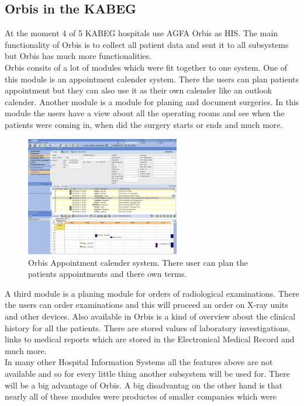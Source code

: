 \documentclass[a4paper]{article}
\begin{document}
	\subsection{Orbis in the KABEG}
	At the moment 4 of 5 KABEG hospitals use AGFA Orbis as HIS. The main
	functionality of Orbis is to collect all patient data and sent it to all
	subsystems but Orbis has much more functionalities.\\
	Orbis consits of a lot of modules which were fit together to one system. One of
	this module is an appointment calender system. There the users can plan
	patients appointment but they can also use it as their own calender like an
	outlook calender. Another module is a module for planing and document
	surgeries. In this module the users have a view about all the operating rooms
	and see when the patients were coming in, when did the surgery starts or ends
	and much more.\\
	\begin{figure}[!ht]
		  \centering
		      \includegraphics[width=0.6\textwidth]{orbis1}
		  \caption{Orbis Appointment calender system. There user can plan the
		  patients appointments and there own terms.}
	\end{figure}
	A third module is a planing module for orders of radiological
	examinations. There the users can order examinations and this will proceed an
	order on X-ray units and other devices. Also available in Orbis is a kind of
	overview about the clinical history for all the patients. There are
	stored values of laboratory investigations, links to medical reports which are stored
	in the Electronical Medical Record and much more.\\
	In many other Hospital Information Systems all the features above are not
	available and so for every little thing another subsystem will be used for.
	There will be a big advantage of Orbis. A big disadvantag on the other hand is
	that nearly all of these modules were productes of smaller companies which were
\end{document}

